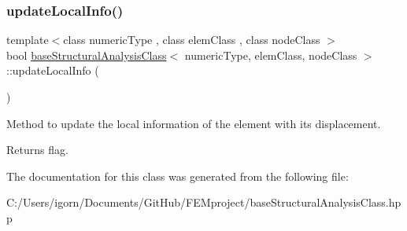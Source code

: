 \subsubsection{\texorpdfstring{update\+Local\+Info()}{updateLocalInfo()}}
{\footnotesize\ttfamily template$<$class numeric\+Type , class elem\+Class , class node\+Class $>$ \\
bool \mbox{\hyperlink{classbase_structural_analysis_class}{base\+Structural\+Analysis\+Class}}$<$ numeric\+Type, elem\+Class, node\+Class $>$\+::update\+Local\+Info (\begin{DoxyParamCaption}{ }\end{DoxyParamCaption})\hspace{0.3cm}{\ttfamily [protected]}}

Method to update the local information of the element with its displacement. \begin{DoxyReturn}{Returns}
flag. 
\end{DoxyReturn}


The documentation for this class was generated from the following file\+:\begin{DoxyCompactItemize}
\item 
C\+:/\+Users/igorn/\+Documents/\+Git\+Hub/\+F\+E\+Mproject/base\+Structural\+Analysis\+Class.\+hpp\end{DoxyCompactItemize}
